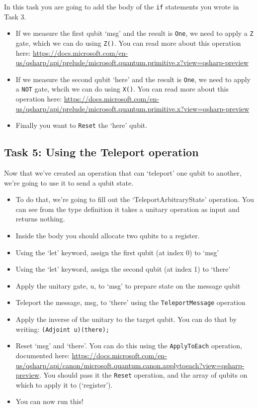 \documentclass[a4paper]{article}
\begin{document}
In this task you are going to add the body of the \verb$if$ statements you wrote in Task 3.
\begin{itemize}
\item If we measure the first qubit `msg' and the result is \verb$One$, we need to apply a \verb$Z$ gate, which we can do using \verb$Z()$. You can read more about this operation here: \url{https://docs.microsoft.com/en-us/qsharp/api/prelude/microsoft.quantum.primitive.z?view=qsharp-preview}
\item If we measure the second qubit `here' and the result is \verb$One$, we need to apply a \verb$NOT$ gate, whcih we can do using \verb$X()$. You can read more about this operation here: \url{https://docs.microsoft.com/en-us/qsharp/api/prelude/microsoft.quantum.primitive.x?view=qsharp-preview}
\item Finally you want to \verb$Reset$ the `here' qubit.
\end{itemize}

\subsection{Task 5: Using the Teleport operation}
Now that we've created an operation that can `teleport' one qubit to another, we're going to use it to send a qubit state. 
\begin{itemize}
\item To do that, we're going to fill out the `TeleportArbitraryState' operation. You can see from the type definition it takes a unitary operation as input and returns nothing.
\item Inside the body you should allocate two qubits to a register.
\item Using the `let' keyword, assign the first qubit (at index 0) to `msg'
\item Using the `let' keyword, assign the second qubit (at index 1) to `there'
\item Apply the unitary gate, u, to `msg' to prepare state on the message qubit
\item Teleport the message, msg, to `there' using the \verb$TeleportMessage$ operation
\item Apply the inverse of the unitary to the target qubit. You can do that by writing: \verb$(Adjoint u)(there);$
\item Reset `msg' and `there'. You can do this using the \verb$ApplyToEach$ operation, documented here: \url{https://docs.microsoft.com/en-us/qsharp/api/canon/microsoft.quantum.canon.applytoeach?view=qsharp-preview}. You should pass it the \verb$Reset$ operation, and the array of qubits on which to apply it to (`register').
\item You can now run this!
\end{itemize}
\end{document}
